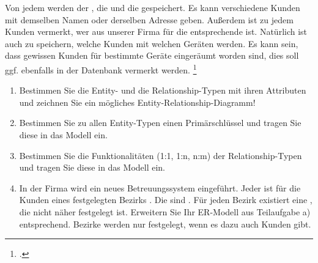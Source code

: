 \documentclass{lehramt-informatik-haupt}
\begin{document}
Von jedem  werden der , die
 und die  gespeichert. Es kann
verschiedene Kunden mit demselben Namen oder derselben Adresse geben.
Außerdem ist zu jedem Kunden vermerkt, wer aus unserer Firma für die
entsprechende  ist.
Natürlich ist auch zu speichern, welche Kunden mit welchen Geräten
 werden. Es kann sein, dass gewissen Kunden
für bestimmte Geräte  eingeräumt worden
sind, dies soll ggf. ebenfalls in der Datenbank vermerkt werden.
\footcite{db:ab:1}

\begin{enumerate}


\item Bestimmen Sie die Entity- und die Relationship-Typen mit ihren
Attributen und zeichnen Sie ein mögliches Entity-Relationship-Diagramm!


\item Bestimmen Sie zu allen Entity-Typen einen Primärschlüssel und
tragen Sie diese in das Modell ein.


\item Bestimmen Sie die Funktionalitäten (1:1, 1:n, n:m) der
Relationship-Typen und tragen Sie diese in das Modell ein.


\item In der Firma wird ein neues Betreuungssystem eingeführt. Jeder
 ist für die Kunden eines festgelegten Bezirks
. Die  sind
. Für jeden Bezirk existiert eine
, die nicht näher festgelegt ist. Erweitern
Sie Ihr ER-Modell aus Teilaufgabe a) entsprechend. Bezirke werden nur
festgelegt, wenn es dazu auch Kunden gibt.

\begin{antwort}[falsch]
\end{antwort}

\begin{antwort}[muster]
\end{antwort}

\end{enumerate}
\end{document}
